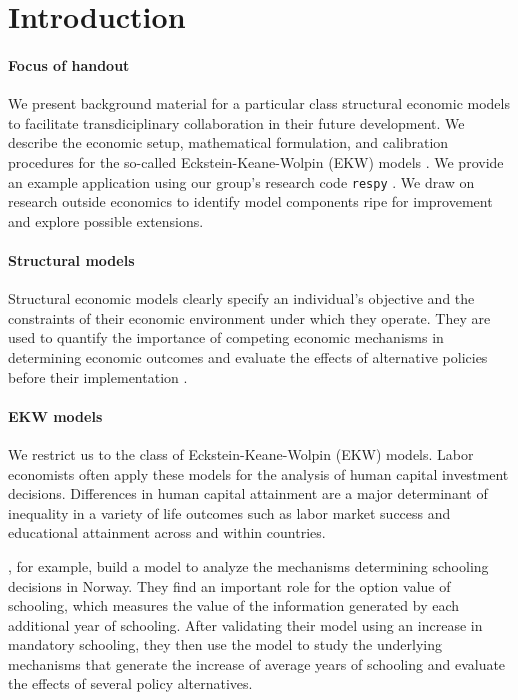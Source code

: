 \section{Introduction}
\paragraph{Focus of handout} We present background material for a particular class structural economic models to facilitate transdiciplinary collaboration in their future development. We describe the economic setup, mathematical formulation, and calibration procedures for the so-called Eckstein-Keane-Wolpin (EKW) models \citep{Aguirregabiria.2010}. We provide an example application using our group's research code \verb+respy+ \citep{respy-1.0}. We draw on research outside economics to identify model components ripe for improvement and explore possible extensions.

\paragraph{Structural models}  Structural economic models clearly specify an individual's objective and the constraints of their economic environment under which they operate. They are used to quantify the importance of competing economic mechanisms in determining economic outcomes and evaluate the effects of alternative policies before their implementation \citep{Wolpin.2013}.

\paragraph{EKW models} We restrict us to the class of Eckstein-Keane-Wolpin (EKW) models. Labor economists often apply these models for the analysis of human capital investment decisions. Differences in human capital attainment are a major determinant of inequality in a variety of life outcomes such as labor market success and educational attainment across
and within countries.

\citet{Bhuller.2018}, for example, build a model to analyze the mechanisms determining schooling decisions in Norway. They find an important role for the option value of schooling, which measures the value of the information generated by each additional year of schooling.
After validating their model using an increase in mandatory schooling, they then use the model to study the underlying mechanisms that generate the increase of average years of schooling and evaluate the effects of several policy alternatives.

